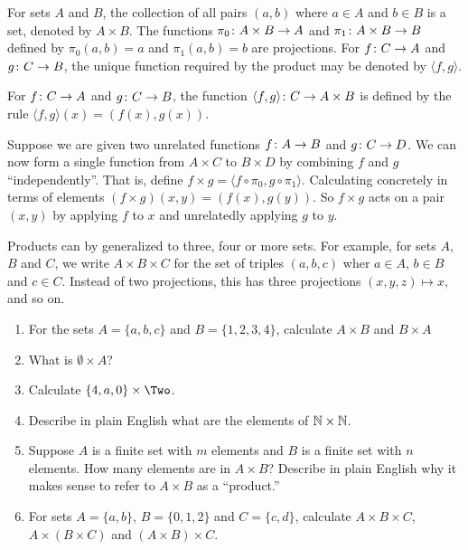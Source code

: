 \begin{principle}\label{ax:products}
	For sets $A$ and $B$, the collection of all pairs $(a,b)$ where $a\in A$ and $b\in B$ is a set, denoted by $A\times B$. 
	The functions ${\pi_0}\colon{A\times B}\to{A}$ and ${\pi_1}\colon{A\times B}\to{B}$ defined by $\pi_0(a,b)=a$
	and $\pi_1(a,b)=b$ are projections. For ${f}\colon{C}\to{A}$ and ${g}\colon{C}\to{B}$, the unique function required by
	the product may be denoted by $\langle f,g\rangle$.

	For ${f}\colon{C}\to{A}$ and ${g}\colon{C}\to{B}$, the function ${\langle f,g\rangle}\colon{C}\to{A\times B}$ is defined by the rule $\langle f,g\rangle(x)=(f(x),g(x))$.
\end{principle}

Suppose we are given two unrelated functions ${f}\colon{A}\to{B}$ and ${g}\colon{C}\to{D}$. 
We can now form a single function from $A\times C$ to $B\times D$ by combining $f$ and $g$ ``independently''. 
That is, define $f\times g = \langle f\circ \pi_0,g\circ \pi_1\rangle$.
Calculating concretely in terms of elements $(f\times g)(x,y) = (f(x),g(y))$. 
So $f\times g$ acts on a pair $(x,y)$ by applying $f$ to $x$ and unrelatedly applying $g$ to $y$. 

Products can by generalized to three, four or more sets.
For example, for sets $A$, $B$ and $C$, we write $A\times B\times C$ for the set of triples $(a,b,c)$ wher $a\in A$, $b\in B$ and $c\in C$. Instead of two projections, this has three projections $(x,y,z)\mapsto x$, and so on.
 

\begin{exercises}
	\begin{enumerate}
		\item For the sets $A = \{a,b,c\}$ and $B = \{1,2,3,4\}$, calculate $A\times B$ and $B\times A$
		\item What is $\emptyset \times A$? 
		\item Calculate $\{4,a,0\}\times \Two$.
		\item Describe in plain English what are the elements of $\mathbb N\times \mathbb N$.
		\item Suppose $A$ is a finite set with $m$ elements and $B$ is a finite set with $n$ elements.
		How many elements are in $A\times B$?
		Describe in plain English why it makes sense to refer to $A\times B$ as a ``product.''
		\item For sets $A=\{a,b\}$, $B=\{0,1,2\}$ and $C=\{c,d\}$, calculate $A\times B\times C$, $A\times (B\times C)$ and $(A\times B)\times C$.
	\end{enumerate}
\end{exercises}

